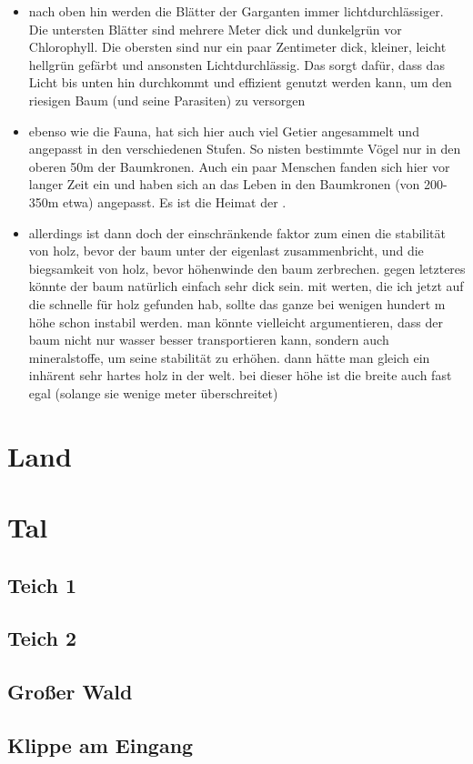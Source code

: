\begin{itemize}
	\item nach oben hin werden die Blätter der Garganten immer lichtdurchlässiger. Die untersten Blätter sind mehrere Meter dick und dunkelgrün vor Chlorophyll. Die obersten sind nur ein paar Zentimeter dick, kleiner, leicht hellgrün gefärbt und ansonsten Lichtdurchlässig. Das sorgt dafür, dass das Licht bis unten hin durchkommt und effizient genutzt werden kann, um den riesigen Baum (und seine Parasiten) zu versorgen
	\item ebenso wie die Fauna, hat sich hier auch viel Getier angesammelt und angepasst in den verschiedenen Stufen. So nisten bestimmte Vögel nur in den oberen 50m der Baumkronen. Auch ein paar Menschen fanden sich hier vor langer Zeit ein und haben sich an das Leben in den Baumkronen (von 200-350m etwa) angepasst. Es ist die Heimat der .
	\item allerdings ist dann doch der einschränkende faktor zum einen die stabilität von holz, bevor der baum unter der eigenlast zusammenbricht, und die biegsamkeit von holz, bevor höhenwinde den baum zerbrechen. gegen letzteres könnte der baum natürlich einfach sehr dick sein. mit werten, die ich jetzt auf die schnelle für holz gefunden hab, sollte das ganze bei wenigen hundert m höhe schon instabil werden. man könnte vielleicht argumentieren, dass der baum nicht nur wasser besser transportieren kann, sondern auch mineralstoffe, um seine stabilität zu erhöhen. dann hätte man gleich ein inhärent sehr hartes holz in der welt. bei dieser höhe ist die breite auch fast egal (solange sie wenige meter überschreitet)
\end{itemize}

\section{Land}
\section{Tal}
\subsection{Teich 1}
\subsection{Teich 2}
\subsection{Großer Wald}
\subsection{Klippe am Eingang}

